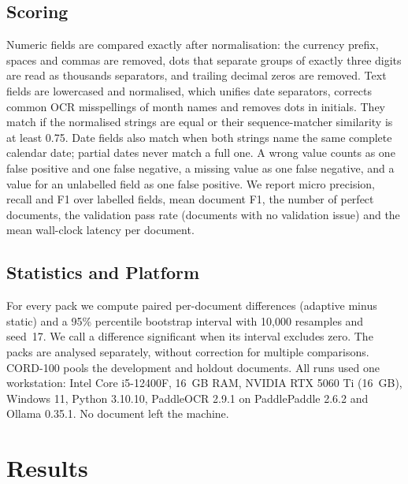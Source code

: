 \documentclass[conference,a4paper]{IEEEtran}
\begin{document}
\subsection{Scoring}
Numeric fields are compared exactly after normalisation: the currency prefix, spaces and commas are removed, dots that separate groups of exactly three digits are read as thousands separators, and trailing decimal zeros are removed. Text fields are lowercased and normalised, which unifies date separators, corrects common OCR misspellings of month names and removes dots in initials. They match if the normalised strings are equal or their sequence-matcher similarity is at least 0.75. Date fields also match when both strings name the same complete calendar date; partial dates never match a full one. A wrong value counts as one false positive and one false negative, a missing value as one false negative, and a value for an unlabelled field as one false positive. We report micro precision, recall and F1 over labelled fields, mean document F1, the number of perfect documents, the validation pass rate (documents with no validation issue) and the mean wall-clock latency per document.

\subsection{Statistics and Platform}
For every pack we compute paired per-document differences (adaptive minus static) and a 95\% percentile bootstrap interval with 10{,}000 resamples and seed~17. We call a difference significant when its interval excludes zero. The packs are analysed separately, without correction for multiple comparisons. CORD-100 pools the development and holdout documents. All runs used one workstation: Intel Core i5-12400F, 16~GB RAM, NVIDIA RTX 5060 Ti (16~GB), Windows 11, Python 3.10.10, PaddleOCR 2.9.1 on PaddlePaddle 2.6.2 and Ollama 0.35.1. No document left the machine.

\section{Results}
\label{sec:results}
\end{document}
